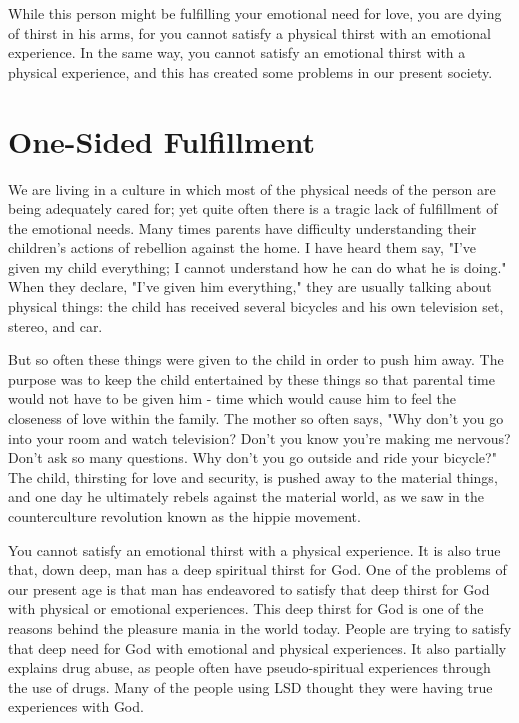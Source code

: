 While this person might be fulfilling your emotional need for love, you are dying of thirst in his arms, for you cannot satisfy a physical thirst with an emotional experience. In the same way, you cannot satisfy an emotional thirst with a physical experience, and this has created some problems in our present society. 

\section*{One-Sided Fulfillment}

We are living in a culture in which most of the physical needs of the person are being adequately cared for; yet quite often there is a tragic lack of fulfillment of the emotional needs. Many times parents have difficulty understanding their children's actions of rebellion against the home. I have heard them say, "I've given my child everything; I cannot understand how he can do what he is doing." When they declare, "I've given him everything," they are usually talking about physical things: the child has received several bicycles and his own television set, stereo, and car. 

But so often these things were given to the child in order to push him away. The purpose was to keep the child entertained by these things so that parental time would not have to be given him - time which would cause him to feel the closeness of love within the family. The mother so often says, "Why don't you go into your room and watch television? Don't you know you're making me nervous? Don't ask so many questions. Why don't you go outside and ride your bicycle?" The child, thirsting for love and security, is pushed away to the material things, and one day he ultimately rebels against the material world, as we saw in the counterculture revolution known as the hippie movement. 

You cannot satisfy an emotional thirst with a physical experience. It is also true that, down deep, man has a deep spiritual thirst for God. One of the problems of our present age is that man has endeavored to satisfy that deep thirst for God with physical or emotional experiences. This deep thirst for God is one of the reasons behind the pleasure mania in the world today. People are trying to satisfy that deep need for God with emotional and physical experiences. It also partially explains drug abuse, as people often have pseudo-spiritual experiences through the use of drugs. Many of the people using LSD thought they were having true experiences with God. 

